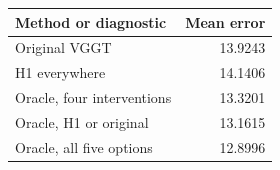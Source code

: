 \begin{tabular}{lr}
\toprule
Method or diagnostic & Mean error\\
\midrule
Original VGGT & 13.9243\\
H1 everywhere & 14.1406\\
\midrule
Oracle, four interventions & 13.3201\\
Oracle, H1 or original & 13.1615\\
Oracle, all five options & 12.8996\\
\bottomrule
\end{tabular}
